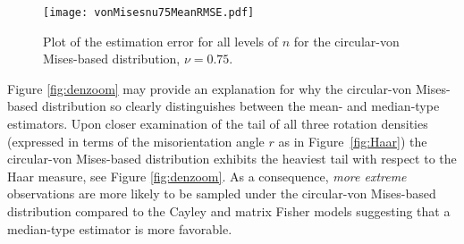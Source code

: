 
\begin{figure}[h!]
\centering
\texttt{[image: vonMisesnu75MeanRMSE.pdf]}
\caption{Plot of the estimation error for all levels of $n$ for the circular-von Mises-based distribution,  $\nu=0.75$.  \label{fig:vmnu75}}
\end{figure}

Figure \ref{fig:denzoom} may provide an explanation for why the circular-von Mises-based distribution so clearly distinguishes between the mean- and median-type estimators.  Upon closer examination of the tail of all three rotation densities (expressed in terms of the misorientation angle $r$ as in Figure~\ref{fig:Haar}) the circular-von Mises-based distribution exhibits the heaviest tail with respect to the Haar measure, see Figure \ref{fig:denzoom}. As a consequence, \textit{more extreme} observations are more likely to be sampled under the circular-von Mises-based distribution compared to the Cayley and matrix Fisher models suggesting that a median-type estimator is more favorable. 

